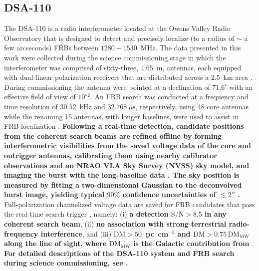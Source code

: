 \documentclass[twocolumn, linenumbers]{aastex701}
\newcommand{\newchange}[1]{{\color{red}\textbf{#1}}}
\begin{document}
\subsection{DSA-110} \label{sec:obs_dsa}
The DSA-110 is a radio interferometer located at the Owens Valley Radio Observatory that is designed to detect and precisely localize (to a radius of $\sim$ a few arcseconds) FRBs between $1280-1530$~MHz. The data presented in this work were collected during the science commissioning stage in which the interferometer was comprised of sixty-three, $4.65$~m, antennas, each equipped with dual-linear-polarization receivers that are distributed across a $2.5$~km area \citep{2024ApJ...967...29L}. During commissioning the antenna were pointed at a declination of $71.6^\circ$ with an effective field of view of $10^{\circ}{}^{2}$. An FRB search was conducted at a frequency and time resolution of $30.52$~kHz and $32.768~\mu\mathrm{s}$, respectively, using 48 core antennas while the renaming 15 antennas, with longer baselines, were used to assist in FRB localization \citep{2024ApJ...964..131S}. \newchange{Following a real-time detection, candidate positions from the coherent search beams are refined offline by forming interferometric visibilities from the saved voltage data of the core and outrigger antennas, calibrating them using nearby calibrator observations and an NRAO VLA Sky Survey (NVSS) sky model, and imaging the burst with the long-baseline data \citep{2023ApJ...949L...3R}. The sky position is measured by fitting a two-dimensional Gaussian to the deconvolved burst image, yielding typical $90\%$ confidence uncertainties of $\lesssim 2''$ \citep{2024ApJ...967...29L, 2023ApJ...949L...3R}.} Full-polarization channelized voltage data are saved for FRB candidates that pass the real-time search trigger \citep{2024ApJ...967...29L}, namely: (i) \newchange{a detection $\mathrm{S/N} > 8.5$ in any coherent search beam}, (ii) \newchange{no association with strong terrestrial radio-frequency interference}, and (iii) \newchange{$\mathrm{DM} > 50$~pc~cm$^{-3}$ and $\mathrm{DM} > 0.75\,\mathrm{DM}_\mathrm{MW}$ along the line of sight, where $\mathrm{DM}_\mathrm{MW}$ is the Galactic contribution from \citet{2002astro.ph..7156C}}. \newchange{For detailed descriptions of the DSA-110 system and FRB search during science commissioning, see \citep{2023ApJ...949L...3R, 2024ApJ...967...29L}.}
\end{document}
